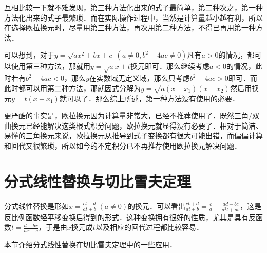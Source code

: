 \documentclass{ctexbook}
\begin{document}
互相比较一下就不难发现，第三种方法化出来的式子最简单，第二种次之，第一种方法化出来的式子最繁琐．而在实际操作过程中，当然是计算量越小越有利，所以在选择欧拉换元时，尽量用第三种方法，再次用第二种方法，不得已再用第一种方法．\par
可以想到，对于$y=\sqrt{ax^{2}+bx+c}\;\left(a\ne0,b^{2}-4ac\ne0\right)$凡有$a>0$的情况，都可以使用第三种方法，那就用$y=\sqrt{a}x+t$换元即可．那么继续考虑$a<0$的情况，此时若有$b^{2}-4ac<0$，那么$y$在实数域无定义域，那么只考虑$b^{2}-4ac>0$即可．而此时都可以用第二种方法，那就因式分解为$y=\sqrt{a\left(x-x_{1}\right)\left(x-x_{2}\right)}$然后用换元$y=t\left(x-x_{1}\right)$就可以了．那么综上所述，第一种方法没有使用的必要．\par
更严酷的事实是，欧拉换元因为计算量非常大，已经不推荐使用了．既然三角/双曲换元已经能解决这类根式积分问题，欧拉换元就显得没有必要了．相对于简洁、易懂的三角换元来说，欧拉换元从推导到式子变换都有很大可能出错，而偏偏计算和回代又很繁琐，所以如今的不定积分已不再推荐使用欧拉换元解决问题．\par
\section{分式线性替换与切比雪夫定理}
分式线性替换是形如$x=\frac{ct+d}{at+b}\;\left(a\ne0\right)$的换元．可以看出$\frac{ct+d}{at+b}=\frac{c}{a}+\frac{ad-bc}{a^{2}t+ab}$，这是反比例函数经平移变换后得到的形式．这种变换拥有很好的性质，尤其是具有反函数$t=\frac{d-bx}{ax-c}$，于是由$x$换元成$t$以及相应的回代过程都比较容易．\par
本节介绍分式线性替换在切比雪夫定理中的一些应用．\par
\end{document}
